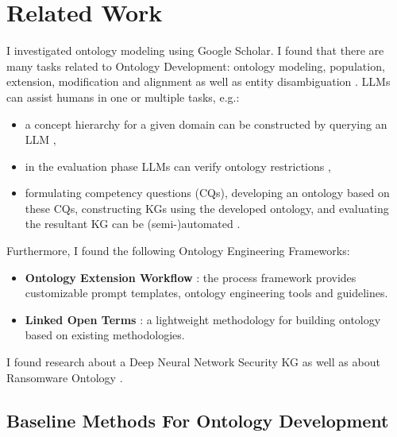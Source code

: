 \documentclass{article}
\begin{document}

\section{Related Work}

I investigated ontology modeling using Google Scholar. I found that there are many tasks related to Ontology Development: ontology modeling, population, extension, modification and alignment as well as entity disambiguation \cite{Shimizu2025}. LLMs can assist humans in one or multiple tasks, e.g.:
\begin{itemize}
    \item a concept hierarchy for a given domain can be constructed by querying an LLM \cite{Funk2023},
    \item in the evaluation phase LLMs can verify ontology restrictions \cite{Tsaneva2024},
    \item formulating competency questions (CQs), developing an ontology  based on these CQs, constructing KGs using the developed ontology, and evaluating the resultant KG can be (semi-)automated \cite{Kommineni2024}.
\end{itemize}


Furthermore, I found the following Ontology Engineering Frameworks:
\begin{itemize}
    \item \textbf{Ontology Extension Workflow} \cite{Garca-Fernndez2025}: the process framework provides customizable prompt templates, ontology engineering tools and guidelines.
    \item \textbf{Linked Open Terms} \cite{Poveda-Villaln2022}: a lightweight methodology for building ontology based on existing methodologies.
\end{itemize}

I found research about a Deep Neural Network Security KG \cite{Altoub2022} as well as about Ransomware Ontology \cite{Keshavarzi2023}.

\subsection{Baseline Methods For Ontology Development}
\end{document}
